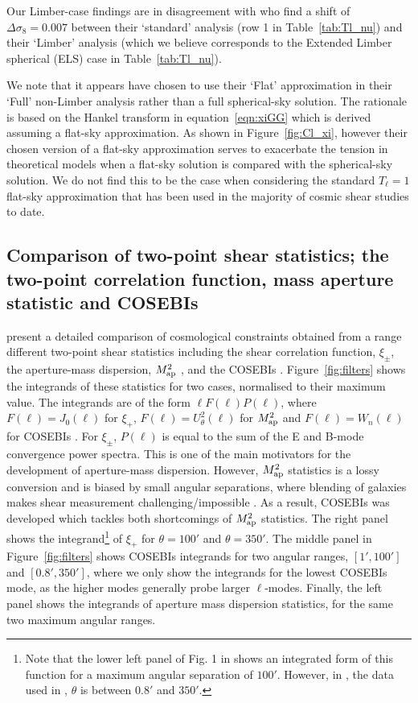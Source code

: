 Our Limber-case findings are in disagreement with \citet{kitching/etal:2016} who find a shift of $\Delta \sigma_8 = 0.007$ between their `standard' analysis (row 1 in Table~\ref{tab:Tl_nu}) and their `Limber' analysis (which we believe corresponds to the Extended Limber spherical (ELS) case in Table~\ref{tab:Tl_nu}).  

We note that it appears \citet{kitching/etal:2016} have chosen to use their `Flat' approximation in their `Full' non-Limber analysis rather than a full spherical-sky solution.  The rationale is based on the Hankel transform in equation~\ref{eqn:xiGG} which is derived assuming a flat-sky approximation.  As shown in Figure~\ref{fig:Cl_xi}, however their chosen version of a flat-sky approximation serves to exacerbate the tension in theoretical models when a flat-sky solution is compared with the spherical-sky solution. We do not find this to be the case when considering the standard $T_\ell = 1$ flat-sky approximation that has been used in the majority of cosmic shear studies to date.

\subsection{Comparison of two-point shear statistics; the two-point correlation function, mass aperture statistic and COSEBIs}
\citet{kilbinger/etal:2013} present a detailed comparison of cosmological constraints obtained from a range different two-point shear statistics including the shear correlation function, $\xi_\pm$, the aperture-mass dispersion, $M_ {\rm ap}^2$ \citep{schneider/etal:1998}, and the COSEBIs \citep{schneider/etal:2010}.  Figure~\ref{fig:filters} shows the integrands of these statistics 
for two cases, normalised to their maximum value.  The integrands are of the form $\ell F(\ell) P(\ell)$, where $F(\ell)=J_0(\ell)$ for $\xi_+$, $F(\ell)= U^2_\theta(\ell)$ for  $M_ {\rm ap}^2$ \citep[see][]{schneider/etal:1998} and $F(\ell)=W_n(\ell)$ for COSEBIs \citep[see][]{schneider/etal:2010}. For $\xi_\pm$, $P(\ell)$ is equal to the sum of the E and B-mode convergence power spectra. This is one of the main motivators for the development of aperture-mass dispersion. However, $M_ {\rm ap}^2$ statistics is a lossy conversion and is biased by small angular separations,
where blending of galaxies makes shear measurement challenging/impossible \citep{Kilbinger/etal:2006}. As a result, COSEBIs was developed which tackles both shortcomings of $M_ {\rm ap}^2$ statistics.
The right panel shows the integrand\footnote{Note that the lower left panel of Fig. 1 in \citet{kitching/etal:2016} shows an integrated form of this function for a maximum angular separation of $100'$. However, in \citet{kilbinger/etal:2013}, the data used in \citet{kitching/etal:2016}, $\theta$ is between $0.8'$ and $350'$.} of $\xi_+$ for $\theta=100'$ and $\theta=350'$. The middle panel in Figure~\ref{fig:filters} shows COSEBIs integrands for two angular ranges, $[1',100']$ and $[0.8',350']$, where we only show the integrands for the lowest COSEBIs mode, as the higher modes generally probe larger $\ell$-modes.  Finally, the left panel shows the integrands of aperture mass dispersion statistics, for the same two maximum angular ranges. 

